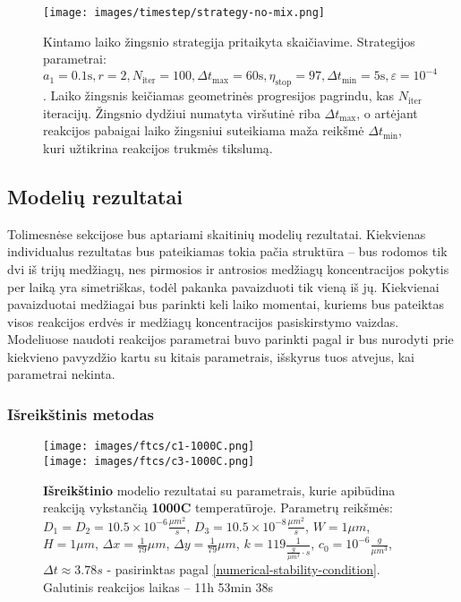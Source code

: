 \begin{figure}[h!]
  \centering
  \texttt{[image: images/timestep/strategy-no-mix.png]}
  \caption{Kintamo laiko žingsnio strategija pritaikyta skaičiavime. Strategijos parametrai: $a_1=0.1\text{s}, r=2, N_\text{iter}=100,\Delta t_\text{max}=60\text{s}, \eta_\text{stop}=97, \Delta t_\text{min}=5\text{s}, \varepsilon=10^{-4}$. Laiko žingsnis keičiamas geometrinės progresijos pagrindu, kas $N_\text{iter}$ iteracijų. Žingsnio dydžiui numatyta viršutinė riba $\Delta t_\text{max}$, o artėjant reakcijos pabaigai laiko žingsniui suteikiama maža reikšmė $\Delta t_\text{min}$, kuri užtikrina reakcijos trukmės tikslumą.  }
  \label{fig:time-step-strategy-visual}
\end{figure}

\newpage
\subsection{Modelių rezultatai}

Tolimesnėse sekcijose bus aptariami skaitinių modelių rezultatai. Kiekvienas individualus rezultatas bus pateikiamas tokia pačia struktūra -- bus rodomos tik dvi iš trijų medžiagų, nes pirmosios ir antrosios medžiagų koncentracijos pokytis per laiką yra simetriškas, todėl pakanka pavaizduoti tik vieną iš jų. Kiekvienai pavaizduotai medžiagai bus parinkti keli laiko momentai, kuriems bus pateiktas visos reakcijos erdvės ir medžiagų koncentracijos pasiskirstymo vaizdas. Modeliuose naudoti reakcijos parametrai buvo parinkti pagal \cite{mackeviciusCloserLookComputer2012} ir bus nurodyti prie kiekvieno pavyzdžio kartu su kitais parametrais, išskyrus tuos atvejus, kai parametrai nekinta.

\newpage

\subsubsection*{Išreikštinis metodas}

\begin{figure}[h!]
  \centering
  \texttt{[image: images/ftcs/c1-1000C.png]} \\ 
  \texttt{[image: images/ftcs/c3-1000C.png]}
  \caption{\textbf{Išreikštinio} modelio rezultatai su parametrais, kurie apibūdina reakciją vykstančią \textbf{1000\degree C} temperatūroje. Parametrų reikšmės: $D_1 = D_2 = 10.5\times 10^{-6} \frac{\mu m^2}{s}$, $D_3 = 10.5\times 10^{-8} \frac{\mu m^2}{s}$, $W = 1\mu m$, $H = 1\mu m$, $\Delta x = \frac{1}{79}\mu m$, $\Delta y = \frac{1}{79} \mu m$, $k = 119 \frac{1}{ \frac{g}{\mu m^3}\cdot s}$, $c_0 = 10^{-6} \frac{g}{\mu m^3}$, $\Delta t \approx 3.78s$ - pasirinktas pagal \eqref{numerical-stability-condition}. Galutinis reakcijos laikas -- 11h 53min 38s }
  \label{fig:ftcs-result-T-1000}
\end{figure}

